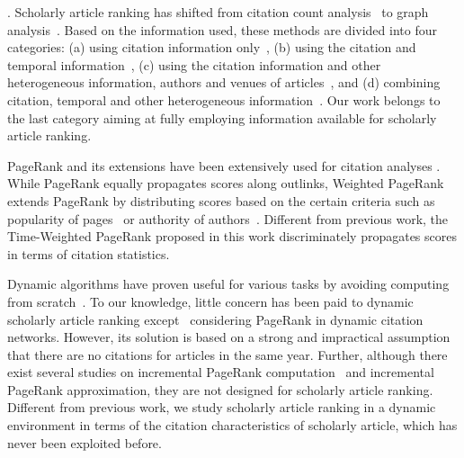 . %
%
%
Scholarly article ranking has shifted from citation count analysis~\cite{Garfield471,Hirsch15112005} to graph analysis~\cite{ChenXMR07,Zhou07-CoRank,Jiang12-MRank,Liang16AAAI,Li08TSRanking,Wang13AAAI,WalkerXKM07,sayyadi09,
Wang16TIST,Ng11KDD}.
Based on the information used, these methods are divided into four categories: (a) using citation information only~\cite{Garfield471,Hirsch15112005,ChenXMR07,Ng11KDD}, (b) using the citation and temporal information~\cite{Li08TSRanking,WalkerXKM07}, (c) using the citation information and other heterogeneous information, \eg authors and venues of articles~\cite{Zhou07-CoRank,Jiang12-MRank,Liang16AAAI}, and (d) combining citation, temporal and other heterogeneous information~\cite{sayyadi09,Wang16TIST,Wang13AAAI}.
Our work belongs to the last category aiming at fully employing information available for scholarly article ranking.




PageRank \cite{Brin98:PageRank} and its extensions have been extensively used for citation analyses \cite{Waltman2014}. While PageRank equally propagates scores along outlinks, Weighted PageRank extends PageRank by distributing scores based on the certain criteria such as popularity of pages~\cite{Xing04:WPR} or authority of authors~\cite{Ding11}. Different from previous work, the Time-Weighted PageRank proposed in this work discriminately propagates scores in terms of citation statistics.







Dynamic algorithms have proven useful for various tasks by avoiding computing from scratch~\cite{RamalingamR93}.
To our knowledge, little concern has been paid to dynamic scholarly article ranking except~\cite{GhoshKHLL11} considering PageRank in dynamic citation networks. However, its solution is based on a strong and impractical assumption that there are no citations for articles in the same year.
Further, although there exist several studies on incremental PageRank computation~\cite{DesikanPSK05,AbiteboulPC03,WuR09} and incremental PageRank approximation\cite{BahmaniCG10,BahmaniKMU12}, they are not designed for scholarly article ranking.
%
Different from previous work, we study scholarly article ranking in a dynamic environment in terms of
the citation characteristics of scholarly article, which has never been exploited before.

